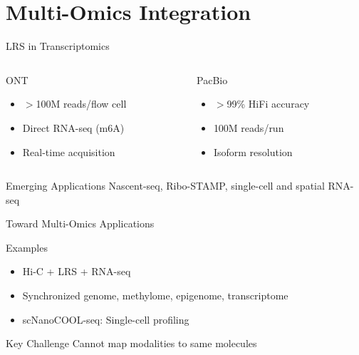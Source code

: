 \documentclass[aspectratio=169]{beamer}
\begin{document}
\section{Multi-Omics Integration}

\begin{frame}{LRS in Transcriptomics}
  \begin{columns}[T]
    \begin{column}{0.48\textwidth}
      \begin{block}{ONT}
        \begin{itemize}
          \item $>$100M reads/flow cell
          \item Direct RNA-seq (m6A)
          \item Real-time acquisition
        \end{itemize}
      \end{block}
    \end{column}
    \begin{column}{0.48\textwidth}
      \begin{block}{PacBio}
        \begin{itemize}
          \item $>$99\% HiFi accuracy
          \item 100M reads/run
          \item Isoform resolution
        \end{itemize}
      \end{block}
    \end{column}
  \end{columns}

  \vspace{0.3cm}

  \begin{block}{Emerging Applications}
    Nascent-seq, Ribo-STAMP, single-cell and spatial RNA-seq
  \end{block}
\end{frame}

\begin{frame}{Toward Multi-Omics Applications}
  \begin{block}{Examples}
    \begin{itemize}
      \item Hi-C + LRS + RNA-seq
      \item Synchronized genome, methylome, epigenome, transcriptome
      \item scNanoCOOL-seq: Single-cell profiling
    \end{itemize}
  \end{block}

  \begin{alertblock}{Key Challenge}
    Cannot map modalities to same molecules
  \end{alertblock}
\end{frame}
\end{document}
